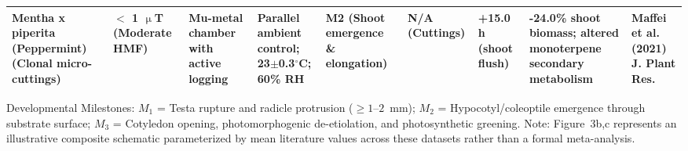\begin{table}[t]
\begin{tabular*}{\textwidth}{@{\extracolsep\fill}p{2.2cm}p{1.6cm}p{1.6cm}p{2.3cm}p{1.6cm}p{1.1cm}p{1.1cm}p{2.2cm}p{2.4cm}@{}}
\raggedright\scriptsize \textbf{Mentha x piperita (Peppermint)} (Clonal micro-cuttings) & \raggedright\scriptsize $<$ 1 $\upmu$T (Moderate HMF) & \raggedright\scriptsize Mu-metal chamber with active logging & \raggedright\scriptsize Parallel ambient control; 23$\pm$0.3$^\circ$C; 60\% RH & \raggedright\scriptsize M2 (Shoot emergence \& elongation) & \raggedright\scriptsize N/A (Cuttings) & \raggedright\scriptsize +15.0 h (shoot flush) & \raggedright\scriptsize -24.0\% shoot biomass; altered monoterpene secondary metabolism & \raggedright\scriptsize Maffei et al. (2021) J. Plant Res. \\
\bottomrule
\end{tabular*}
\begin{tablenotes}
\item Developmental Milestones: $M_1$ = Testa rupture and radicle protrusion ($\ge 1$--$2$~mm); $M_2$ = Hypocotyl/coleoptile emergence through substrate surface; $M_3$ = Cotyledon opening, photomorphogenic de-etiolation, and photosynthetic greening. Note: Figure~3b,c represents an illustrative composite schematic parameterized by mean literature values across these datasets rather than a formal meta-analysis.
\end{tablenotes}
\end{table}
